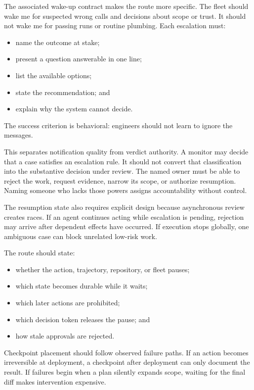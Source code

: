 
The associated wake-up contract makes the route more specific. The fleet should wake me for suspected wrong calls and decisions about scope or trust. It should not wake me for passing runs or routine plumbing. Each escalation must:

\begin{itemize}
\tightlist
\item
  name the outcome at stake;
\item
  present a question answerable in one line;
\item
  list the available options;
\item
  state the recommendation; and
\item
  explain why the system cannot decide.
\end{itemize}

The success criterion is behavioral: engineers should not learn to ignore the messages.

This separates notification quality from verdict authority. A monitor may decide that a case satisfies an escalation rule. It should not convert that classification into the substantive decision under review. The named owner must be able to reject the work, request evidence, narrow its scope, or authorize resumption. Naming someone who lacks those powers assigns accountability without control.

The resumption state also requires explicit design because asynchronous review creates races. If an agent continues acting while escalation is pending, rejection may arrive after dependent effects have occurred. If execution stops globally, one ambiguous case can block unrelated low-risk work.


The route should state:

\begin{itemize}
\tightlist
\item
  whether the action, trajectory, repository, or fleet pauses;
\item
  which state becomes durable while it waits;
\item
  which later actions are prohibited;
\item
  which decision token releases the pause; and
\item
  how stale approvals are rejected.
\end{itemize}

Checkpoint placement should follow observed failure paths. If an action becomes irreversible at deployment, a checkpoint after deployment can only document the result. If failures begin when a plan silently expands scope, waiting for the final diff makes intervention expensive.

